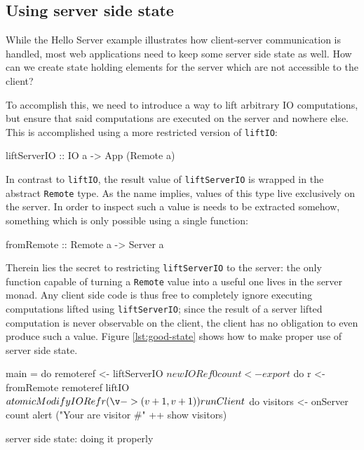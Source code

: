 \documentclass[preprint]{sigplanconf}
\begin{document}
\subsection{Using server side state}

While the Hello Server example illustrates how client-server communication is
handled, most web applications need to keep some server side state as well.
How can we create state holding elements for the server which are not
accessible to the client?

To accomplish this, we need to introduce a way to lift arbitrary IO
computations, but ensure that said computations are executed on the server and
nowhere else. This is accomplished using a more restricted version of
\lstinline!liftIO!:

\begin{code}
liftServerIO :: IO a -> App (Remote a)
\end{code}

In contrast to \lstinline!liftIO!, the result value of \lstinline!liftServerIO!
is wrapped in the abstract \lstinline!Remote! type. As the name implies,
values of this type live exclusively on the server. In order to inspect such a
value is needs to be extracted somehow, something which is only possible using
a single function:

\begin{code}
fromRemote :: Remote a -> Server a
\end{code}

Therein lies the secret to restricting \lstinline!liftServerIO! to the
server: the only function capable of turning a \lstinline!Remote! value into
a useful one lives in the server monad. Any client side code is thus free to
completely ignore executing computations lifted using \lstinline!liftServerIO!;
since the result of a server lifted computation is never observable on the
client, the client has no obligation to even produce such a value.
Figure \ref{lst:good-state} shows how to make proper use of server side state.

\begin{listingfloat}
\begin{code}
main = do
  remoteref <- liftServerIO $ newIORef 0

  count <- export $ do
    r <- fromRemote remoteref
    liftIO $ atomicModifyIORef r (\v -> (v+1, v+1))

  runClient $ do
    visitors <- onServer count
    alert ("Your are visitor #" ++ show visitors)
\end{code}
\caption{server side state: doing it properly}
\label{lst:good-state}
\end{listingfloat}
\end{document}
